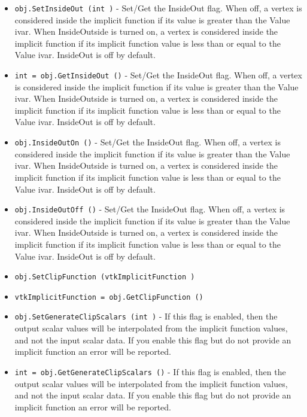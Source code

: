 \begin{itemize}
\item  \verb|obj.SetInsideOut (int )| -  Set/Get the InsideOut flag. When off, a vertex is considered
 inside the implicit function if its value is greater than the
 Value ivar. When InsideOutside is turned on, a vertex is
 considered inside the implicit function if its implicit function
 value is less than or equal to the Value ivar.  InsideOut is off
 by default.

\item  \verb|int = obj.GetInsideOut ()| -  Set/Get the InsideOut flag. When off, a vertex is considered
 inside the implicit function if its value is greater than the
 Value ivar. When InsideOutside is turned on, a vertex is
 considered inside the implicit function if its implicit function
 value is less than or equal to the Value ivar.  InsideOut is off
 by default.

\item  \verb|obj.InsideOutOn ()| -  Set/Get the InsideOut flag. When off, a vertex is considered
 inside the implicit function if its value is greater than the
 Value ivar. When InsideOutside is turned on, a vertex is
 considered inside the implicit function if its implicit function
 value is less than or equal to the Value ivar.  InsideOut is off
 by default.

\item  \verb|obj.InsideOutOff ()| -  Set/Get the InsideOut flag. When off, a vertex is considered
 inside the implicit function if its value is greater than the
 Value ivar. When InsideOutside is turned on, a vertex is
 considered inside the implicit function if its implicit function
 value is less than or equal to the Value ivar.  InsideOut is off
 by default.

\item  \verb|obj.SetClipFunction (vtkImplicitFunction )|

\item  \verb|vtkImplicitFunction = obj.GetClipFunction ()|

\item  \verb|obj.SetGenerateClipScalars (int )| -  If this flag is enabled, then the output scalar values will be 
 interpolated from the implicit function values, and not the 
 input scalar data. If you enable this flag but do not provide an
 implicit function an error will be reported.

\item  \verb|int = obj.GetGenerateClipScalars ()| -  If this flag is enabled, then the output scalar values will be 
 interpolated from the implicit function values, and not the 
 input scalar data. If you enable this flag but do not provide an
 implicit function an error will be reported.


\end{itemize}
